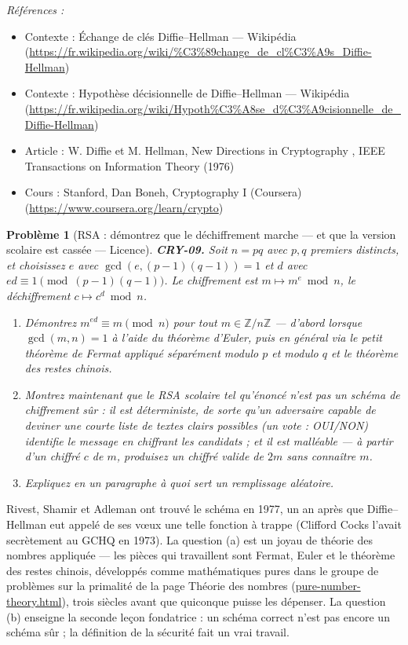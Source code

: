 \documentclass[11pt]{article}
\newtheorem{problem}{Problème}
\newenvironment{refs}{\par\small\noindent\emph{Références :}\begin{itemize}\setlength\itemsep{0pt}}{\end{itemize}\normalsize}
\begin{document}
\begin{refs}
\item Contexte : Échange de clés Diffie--Hellman --- Wikipédia (\url{https://fr.wikipedia.org/wiki/%C3%89change_de_cl%C3%A9s_Diffie-Hellman})
\item Contexte : Hypothèse décisionnelle de Diffie--Hellman --- Wikipédia (\url{https://fr.wikipedia.org/wiki/Hypoth%C3%A8se_d%C3%A9cisionnelle_de_Diffie-Hellman})
\item Article : W. Diffie et M. Hellman, \og{} New Directions in Cryptography \fg{}, IEEE Transactions on Information Theory (1976)
\item Cours : Stanford, Dan Boneh, Cryptography I (Coursera) (\url{https://www.coursera.org/learn/crypto})
\end{refs}

\bigskip

\begin{problem}[{RSA : démontrez que le déchiffrement marche --- et que la version scolaire est cassée --- Licence}]
\textbf{CRY-09.} Soit $n = pq$ avec $p, q$ premiers distincts,
et choisissez $e$ avec $\gcd(e,(p-1)(q-1)) = 1$ et $d$ avec
$ed \equiv 1 \pmod{(p-1)(q-1)}$. Le chiffrement est $m \mapsto m^e \bmod n$, le
déchiffrement $c \mapsto c^d \bmod n$.
\begin{enumerate}
\item[(a)] Démontrez $m^{ed} \equiv m \pmod n$ pour
\textit{tout} $m \in \mathbb{Z}/n\mathbb{Z}$ --- d'abord lorsque $\gcd(m,n)=1$ à l'aide du
théorème d'Euler, puis en général via le petit théorème de Fermat appliqué séparément modulo
$p$ et modulo $q$ et le théorème des restes chinois.
\item[(b)] Montrez maintenant que le \og{} RSA scolaire \fg{}
tel qu'énoncé n'est pas un schéma de chiffrement sûr : il est déterministe, de sorte qu'un
adversaire capable de deviner une courte liste de textes clairs possibles (un vote :
OUI/NON) identifie le message en chiffrant les candidats ; et il est malléable --- à partir
d'un chiffré $c$ de $m$, produisez un chiffré valide de $2m$ sans connaître $m$.
\item[(c)] Expliquez
en un paragraphe à quoi sert un remplissage aléatoire.
\end{enumerate}

\end{problem}

\noindent Rivest, Shamir et Adleman ont trouvé le schéma en 1977, un an après que
Diffie--Hellman eut appelé de ses v\oe{}ux une telle fonction \og{} à trappe \fg{} (Clifford Cocks
l'avait secrètement au GCHQ en 1973). La question (a) est un joyau de théorie des nombres
appliquée --- les pièces qui travaillent sont Fermat, Euler et le théorème des restes chinois,
développés comme mathématiques pures dans le groupe de problèmes sur la primalité de la page
Théorie des nombres (\url{pure-number-theory.html}), trois siècles avant que quiconque
puisse les dépenser. La question (b) enseigne la seconde leçon fondatrice : un schéma
correct n'est pas encore un schéma sûr ; la définition de la sécurité fait un vrai
travail.
\end{document}
